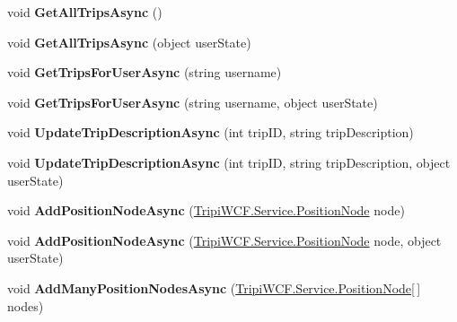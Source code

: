 \begin{DoxyCompactItemize}
\item 
\hypertarget{class_trip_service_client_a1de733221c694d0e53a037a6028876c6}{
void {\bfseries GetAllTripsAsync} ()}
\label{class_trip_service_client_a1de733221c694d0e53a037a6028876c6}

\item 
\hypertarget{class_trip_service_client_ae2d292280d0bc4223e10324a044f057a}{
void {\bfseries GetAllTripsAsync} (object userState)}
\label{class_trip_service_client_ae2d292280d0bc4223e10324a044f057a}

\item 
\hypertarget{class_trip_service_client_abf37a65ba72504c498cb9dce2f0f91c7}{
void {\bfseries GetTripsForUserAsync} (string username)}
\label{class_trip_service_client_abf37a65ba72504c498cb9dce2f0f91c7}

\item 
\hypertarget{class_trip_service_client_abdaa0d093a9662740585b7e61db6633a}{
void {\bfseries GetTripsForUserAsync} (string username, object userState)}
\label{class_trip_service_client_abdaa0d093a9662740585b7e61db6633a}

\item 
\hypertarget{class_trip_service_client_a240fe3d84c330dd69a7739704a687ac6}{
void {\bfseries UpdateTripDescriptionAsync} (int tripID, string tripDescription)}
\label{class_trip_service_client_a240fe3d84c330dd69a7739704a687ac6}

\item 
\hypertarget{class_trip_service_client_adc7cca208029a5a744ceac9bf5046e19}{
void {\bfseries UpdateTripDescriptionAsync} (int tripID, string tripDescription, object userState)}
\label{class_trip_service_client_adc7cca208029a5a744ceac9bf5046e19}

\item 
\hypertarget{class_trip_service_client_a2f46a97c1e1e43c6aaa2dd1087fb59f3}{
void {\bfseries AddPositionNodeAsync} (\hyperlink{class_tripi_w_c_f_1_1_service_1_1_position_node}{TripiWCF.Service.PositionNode} node)}
\label{class_trip_service_client_a2f46a97c1e1e43c6aaa2dd1087fb59f3}

\item 
\hypertarget{class_trip_service_client_a96846c11d938c1877149a2334bb2d901}{
void {\bfseries AddPositionNodeAsync} (\hyperlink{class_tripi_w_c_f_1_1_service_1_1_position_node}{TripiWCF.Service.PositionNode} node, object userState)}
\label{class_trip_service_client_a96846c11d938c1877149a2334bb2d901}

\item 
\hypertarget{class_trip_service_client_a3af0c86e31fad01e277ea39904293c66}{
void {\bfseries AddManyPositionNodesAsync} (\hyperlink{class_tripi_w_c_f_1_1_service_1_1_position_node}{TripiWCF.Service.PositionNode}\mbox{[}$\,$\mbox{]} nodes)}
\label{class_trip_service_client_a3af0c86e31fad01e277ea39904293c66}


\end{DoxyCompactItemize}
